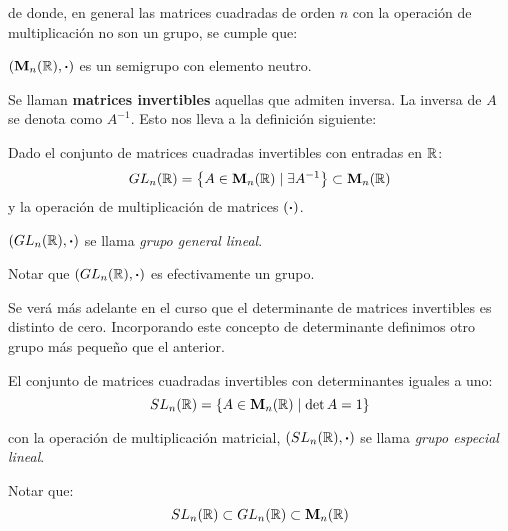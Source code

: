 de donde, en general las matrices cuadradas de orden $n$ con la operación de multiplicación no son un grupo, se cumple que:

\begin{center}
	$(\mathbf{M}_n(\mathbb{R}), \boldsymbol{\cdot})$ es un semigrupo con elemento neutro.
\end{center}

Se llaman \textbf{matrices invertibles} aquellas que admiten inversa. La inversa de $A$ se denota como $A^{-1}$. Esto nos lleva a la definición siguiente:

\begin{fmd-definition}
	
	Dado el conjunto de matrices cuadradas invertibles con entradas en $\mathbb{R}$:
	\[ GL_n(\mathbb{R}) = \left\{ A \in \mathbf{M}_n(\mathbb{R}) \mid \exists A^{-1} \right\} \subset \mathbf{M}_n(\mathbb{R}) \]
	y la operación de multiplicación de matrices $(\boldsymbol{\cdot})$.
	
	$(GL_n(\mathbb{R}), \boldsymbol{\cdot})$ se llama \textit{grupo general lineal}.
\end{fmd-definition}

Notar que $(GL_n(\mathbb{R}), \boldsymbol{\cdot})$ es efectivamente un grupo.

Se verá más adelante en el curso que el determinante de matrices invertibles es distinto de cero. Incorporando este concepto de determinante definimos otro grupo más pequeño que el anterior.

\begin{fmd-definition}
	
	El conjunto de matrices cuadradas invertibles con determinantes iguales a uno:
	\[ SL_n(\mathbb{R}) = \left\{ A \in \mathbf{M}_n(\mathbb{R}) \mid \det A = 1 \right\} \]
	
	con la operación de multiplicación matricial, $(SL_n(\mathbb{R}), \boldsymbol{\cdot})$ se llama \textit{grupo especial lineal}.
\end{fmd-definition}
Notar que:
\[ SL_n(\mathbb{R}) \subset GL_n(\mathbb{R}) \subset \mathbf{M}_n(\mathbb{R})\]

